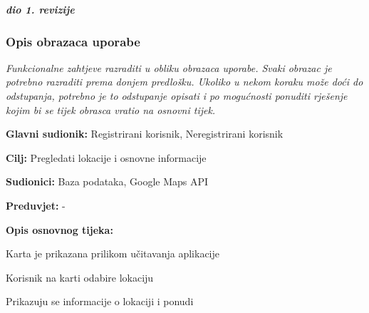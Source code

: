 				\textbf{\textit{dio 1. revizije}}
				
				\subsubsection{Opis obrazaca uporabe}
					\textit{Funkcionalne zahtjeve razraditi u obliku obrazaca uporabe. Svaki obrazac je potrebno razraditi prema donjem predlošku. Ukoliko u nekom koraku može doći do odstupanja, potrebno je to odstupanje opisati i po mogućnosti ponuditi rješenje kojim bi se tijek obrasca vratio na osnovni tijek.}\\
					

					\noindent {}
					\begin{packed_item}
	
						\item \textbf{Glavni sudionik: }Registrirani korisnik, Neregistrirani korisnik
						\item  \textbf{Cilj:} Pregledati lokacije i osnovne informacije
						\item  \textbf{Sudionici:} Baza podataka, Google Maps API
						\item  \textbf{Preduvjet:} -
						\item  \textbf{Opis osnovnog tijeka:}
						
						\item[] \begin{packed_enum}
	
							\item Karta je prikazana prilikom učitavanja aplikacije
							\item Korisnik na karti odabire lokaciju
							\item Prikazuju se informacije o lokaciji i ponudi

						\end{packed_enum}
						
					\end{packed_item}
					
